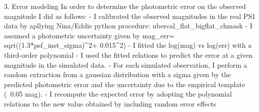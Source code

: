         3. Error modeling
        In order to determine the photometric error on the observed magnitude I did as follows:
        - I calibrated the observed magnitudes in the real PS1 data by apllying Nina/Eddie python procedure:
        ubercal_flat_bigflat_chmask
        - I assumed a photometric uncertainty given by mag_err= sqrt((1.3*psf_inst_sigma)^2+ 0.015^2)
        - I fitted the log(mag) vs log(err) with a third-order polynomial 
        - I used the fitted relations to predict the error at a given magnitude in the simulated data. 
        - For each simulated observation, I perform a random extraction from a gaussian distribution 
        with a sigma given by the predicted photometric error and the uncertainty due to the empirical template (~0.05 mag). 
        - I recompute the expected error by adopting the polynomial relations to the new value obtained by including random error effects
        
        
        






